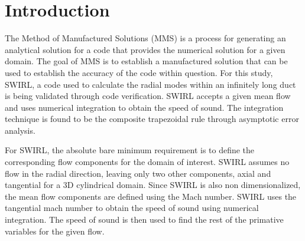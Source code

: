 
\section{Introduction}
The Method of Manufactured Solutions (MMS) is a process for generating an 
analytical solution for a code that provides the numerical solution for a 
given domain. The goal of MMS is to establish a manufactured solution that can 
be used to establish the accuracy of the code within question. For this study, 
SWIRL, a code used to calculate the radial modes within an infinitely long duct
is being validated through code verification. SWIRL accepts a given mean flow and 
uses numerical integration to obtain the speed of sound. The integration technique
is found to be the composite trapezoidal rule through asymptotic error analysis.

For SWIRL, the absolute bare minimum requirement is to define the corresponding
flow components for the domain of interest. SWIRL assumes no flow in the radial 
direction, leaving only two other components, axial and tangential for a 3D 
cylindrical domain. Since SWIRL is also non dimensionalized, the mean flow 
components are defined using the Mach number. SWIRL uses the tangential mach number
to obtain the speed of sound using numerical integration. The speed of sound
is then used to find the rest of the primative variables for the given flow. 

